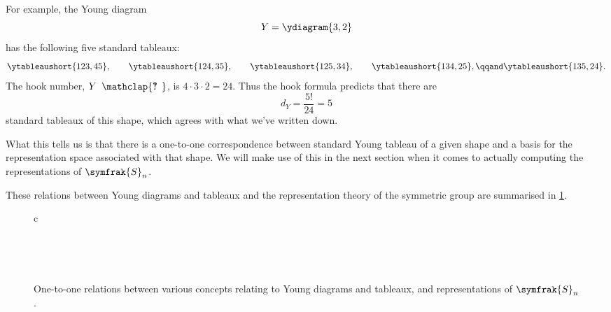 \documentclass[fleqn]{NotesClass}
\newcommand{\symmetricGroup}[1][n]{\symfrak{S}_{#1}}
\newcommand{\hooknumber}[1]{#1{\phantom{?}\mkern1mu\mathclap{\ooalign{\hfil ? \hfil \cr \hfil ! \hfil}}}}
\begin{document}
    For example, the Young diagram
    \begin{equation}
        Y = \ydiagram{3,2}
    \end{equation}
    has the following five standard tableaux:
    \begin{equation}
        \ytableaushort{123,45}, \qquad \ytableaushort{124,35}, \qquad \ytableaushort{125,34}, \qquad \ytableaushort{134,25}, \qqand \ytableaushort{135,24}.
    \end{equation}
    The hook number, \(\hooknumber{Y}\), is \(4 \cdot 3 \cdot 2 = 24\).
    Thus the hook formula predicts that there are
    \begin{equation}
        d_Y = \frac{5!}{24} = 5
    \end{equation}
    standard tableaux of this shape, which agrees with what we've written down.
    
    What this tells us is that there is a one-to-one correspondence between standard Young tableau of a given shape and a basis for the representation space associated with that shape.
    We will make use of this in the next section when it comes to actually computing the representations of \(\symmetricGroup\).
    
    These relations between Young diagrams and tableaux and the representation theory of the symmetric group are summarised in \cref{fig:one-to-one relations in Sn}.
    
    \begin{figure}
        \tikzexternaldisable
        \begin{tabular}{c}
            \\[10ex]
            \\[2ex]
        \end{tabular}
        \tikzexternalenable
        \caption{One-to-one relations between various concepts relating to Young diagrams and tableaux, and representations of \(\symmetricGroup\).}
        \label{fig:one-to-one relations in Sn}
    \end{figure}
    
\end{document}
